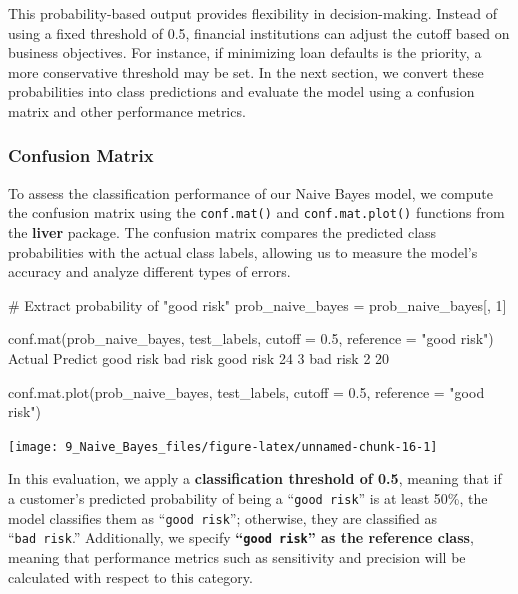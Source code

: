 \documentclass[
  11pt,
]{book}
\makeatletter
\newenvironment{Shaded}{}{}
\newcommand{\AttributeTok}[1]{#1}
\newcommand{\CommentTok}[1]{\textcolor[rgb]{0.36,0.36,0.36}{#1}}
\newcommand{\DecValTok}[1]{#1}
\newcommand{\FloatTok}[1]{#1}
\newcommand{\FunctionTok}[1]{#1}
\newcommand{\NormalTok}[1]{#1}
\newcommand{\OtherTok}[1]{\textcolor[rgb]{0.39,0.39,0.39}{#1}}
\newcommand{\StringTok}[1]{\textcolor[rgb]{0.39,0.39,0.39}{#1}}
\newenvironment{kframe}{%
\medskip{}
\setlength{\fboxsep}{.8em}
 \def\at@end@of@kframe{}%
 \ifinner\ifhmode%
  \def\at@end@of@kframe{\end{minipage}}%
  \begin{minipage}{\columnwidth}%
 \fi\fi%
 \def\FrameCommand##1{\hskip\@totalleftmargin \hskip-\fboxsep
 \colorbox{shadecolor}{##1}\hskip-\fboxsep
     \hskip-\linewidth \hskip-\@totalleftmargin \hskip\columnwidth}%
 \MakeFramed {\advance\hsize-\width
   \@totalleftmargin\z@ \linewidth\hsize
   \@setminipage}}%
 {\par\unskip\endMakeFramed%
 \at@end@of@kframe}
\renewenvironment{Shaded}{\begin{kframe}}{\end{kframe}}
\theoremstyle{definition}
\theoremstyle{definition}
\theoremstyle{definition}
\theoremstyle{definition}
\theoremstyle{remark}
\makeatother
\begin{document}
This probability-based output provides flexibility in decision-making. Instead of using a fixed threshold of 0.5, financial institutions can adjust the cutoff based on business objectives. For instance, if minimizing loan defaults is the priority, a more conservative threshold may be set. In the next section, we convert these probabilities into class predictions and evaluate the model using a confusion matrix and other performance metrics.

\subsubsection*{Confusion Matrix}\label{confusion-matrix-1}


To assess the classification performance of our Naive Bayes model, we compute the confusion matrix using the \texttt{conf.mat()} and \texttt{conf.mat.plot()} functions from the \textbf{liver} package. The confusion matrix compares the predicted class probabilities with the actual class labels, allowing us to measure the model's accuracy and analyze different types of errors.

\begin{Shaded}
\begin{Highlighting}[]
\CommentTok{\# Extract probability of "good risk"}
\NormalTok{prob\_naive\_bayes }\OtherTok{=}\NormalTok{ prob\_naive\_bayes[, }\DecValTok{1}\NormalTok{] }

\FunctionTok{conf.mat}\NormalTok{(prob\_naive\_bayes, test\_labels, }\AttributeTok{cutoff =} \FloatTok{0.5}\NormalTok{, }\AttributeTok{reference =} \StringTok{"good risk"}\NormalTok{)}
\NormalTok{              Actual}
\NormalTok{   Predict     good risk bad risk}
\NormalTok{     good risk        }\DecValTok{24}        \DecValTok{3}
\NormalTok{     bad risk          }\DecValTok{2}       \DecValTok{20}

\FunctionTok{conf.mat.plot}\NormalTok{(prob\_naive\_bayes, test\_labels, }\AttributeTok{cutoff =} \FloatTok{0.5}\NormalTok{, }\AttributeTok{reference =} \StringTok{"good risk"}\NormalTok{)}
\end{Highlighting}
\end{Shaded}

\begin{center}\texttt{[image: 9\_Naive\_Bayes\_files/figure-latex/unnamed-chunk-16-1]} \end{center}

In this evaluation, we apply a \textbf{classification threshold of 0.5}, meaning that if a customer's predicted probability of being a ``\texttt{good\ risk}'' is at least 50\%, the model classifies them as ``\texttt{good\ risk}''; otherwise, they are classified as ``\texttt{bad\ risk}.'' Additionally, we specify \textbf{``\texttt{good\ risk}'' as the reference class}, meaning that performance metrics such as sensitivity and precision will be calculated with respect to this category.
\end{document}
